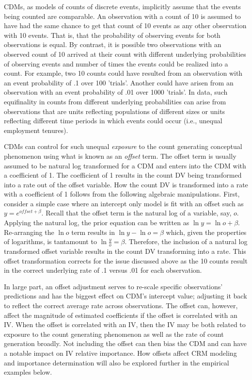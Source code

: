\documentclass[ShortAfour,times,sageapa]{sagej}
\begin{document}
	CDMs, as models of counts of discrete events, implicitly assume that the events being counted are comparable.  
	An observation with a count of 10 is assumed to have had the same chance to get that count of 10 events as any other observation with 10 events.  
	That is, that the probability of observing events for both observations is equal.
	By contrast, it is possible two observations with an observed count of 10 arrived at their count with different underlying probabilities of observing events and number of times the events could be realized into a count.  
	For example, two 10 counts could have resulted from an observation with an event probability of .1 over 100 'trials'.  
	Another could have arisen from an observation with an event probability of .01 over 1000 'trials'.  
	In data, such equifinality in counts from different underlying probabilities can arise from observations that are units reflecting populations of different sizes or units reflecting different time periods in which events could occur (i.e., unequal employment tenures).
	
	CDMs can control for such unequal \emph{exposure} to the count generating conceptual phenomenon using what is known as an \emph{offset} term.  
	The offset term is usually assumed to be natural log transformed for a CDM and enters into the CDM with a coefficient of 1.
	The coefficient of 1 results in the count DV being transformed into a rate out of the offset variable.
	How the count DV is transformed into a rate with a coefficient of 1 follows from the following algebraic manipulations.
	First, consider a simple case where an intercept only model is fit with an offset such as $y = e^{offset + \beta}$.
	Recall that the offset term is the natural log of a variable, say, $o$.  
	Applying the natural log, the prior equation can be written as $\ln y = \ln o + \beta$.
	Re-arranging the $\ln o$ term results in $\ln y - \ln o = \beta$ which, given the properties of logarithms, is tantamount to $\ln \frac{y}{o} = \beta$.
	Therefore, the inclusion of a natural log transformed offset variable results in the count DV transforming into a rate.
	This offset transformation corrects for the issue discussed above as the 10 counts result in the correct underlying rate of .1 versus .01 for each observation.
	
	In large part, an offset adjustment serves to re-scale specific observations' predictions and has the biggest effect on CDM's intercept value; adjusting it back to reflect the correct average rate across observations.
	The offset can, however, affect the magnitude of estimated coefficients if the offset is correlated with an IV.  
	When the offset is correlated with an IV, then the IV may be both related to exposure to the count generating phenomenon as well as the rate of count generation broadly.
	Not including the offset can then bias the CDM and can have a notable impact on IV relative importance.
	How offsets affect CRM modeling and importance determination will also be explored further in the empirical examples below.
	
\end{document}
